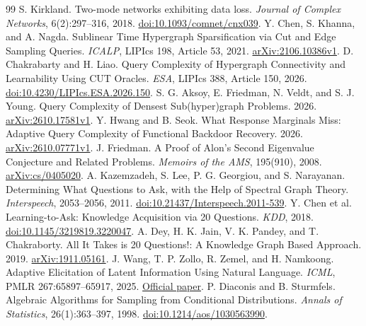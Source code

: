 \documentclass[11pt,a4paper]{article}
\theoremstyle{definition}
\theoremstyle{remark}\newtheorem{remark}[theorem]{주석}
\begin{document}
\begin{thebibliography}{99}
 S. Kirkland. Two-mode networks exhibiting data loss. \emph{Journal of Complex Networks}, 6(2):297--316, 2018. \href{https://doi.org/10.1093/comnet/cnx039}{doi:10.1093/comnet/cnx039}.
 Y. Chen, S. Khanna, and A. Nagda. Sublinear Time Hypergraph Sparsification via Cut and Edge Sampling Queries. \emph{ICALP}, LIPIcs 198, Article 53, 2021. \href{https://arxiv.org/abs/2106.10386v1}{arXiv:2106.10386v1}.
 D. Chakrabarty and H. Liao. Query Complexity of Hypergraph Connectivity and Learnability Using CUT Oracles. \emph{ESA}, LIPIcs 388, Article 150, 2026. \href{https://doi.org/10.4230/LIPIcs.ESA.2026.150}{doi:10.4230/LIPIcs.ESA.2026.150}.
 S. G. Aksoy, E. Friedman, N. Veldt, and S. J. Young. Query Complexity of Densest Sub(hyper)graph Problems. 2026. \href{https://arxiv.org/abs/2610.17581v1}{arXiv:2610.17581v1}.
 Y. Hwang and B. Seok. What Response Marginals Miss: Adaptive Query Complexity of Functional Backdoor Recovery. 2026. \href{https://arxiv.org/abs/2610.07771v1}{arXiv:2610.07771v1}.
 J. Friedman. A Proof of Alon's Second Eigenvalue Conjecture and Related Problems. \emph{Memoirs of the AMS}, 195(910), 2008. \href{https://arxiv.org/abs/cs/0405020}{arXiv:cs/0405020}.
 A. Kazemzadeh, S. Lee, P. G. Georgiou, and S. Narayanan. Determining What Questions to Ask, with the Help of Spectral Graph Theory. \emph{Interspeech}, 2053--2056, 2011. \href{https://doi.org/10.21437/Interspeech.2011-539}{doi:10.21437/Interspeech.2011-539}.
 Y. Chen et al. Learning-to-Ask: Knowledge Acquisition via 20 Questions. \emph{KDD}, 2018. \href{https://doi.org/10.1145/3219819.3220047}{doi:10.1145/3219819.3220047}.
 A. Dey, H. K. Jain, V. K. Pandey, and T. Chakraborty. All It Takes is 20 Questions!: A Knowledge Graph Based Approach. 2019. \href{https://arxiv.org/abs/1911.05161}{arXiv:1911.05161}.
 J. Wang, T. P. Zollo, R. Zemel, and H. Namkoong. Adaptive Elicitation of Latent Information Using Natural Language. \emph{ICML}, PMLR 267:65897--65917, 2025. \href{https://proceedings.mlr.press/v267/wang25ff.html}{Official paper}.
 P. Diaconis and B. Sturmfels. Algebraic Algorithms for Sampling from Conditional Distributions. \emph{Annals of Statistics}, 26(1):363--397, 1998. \href{https://doi.org/10.1214/aos/1030563990}{doi:10.1214/aos/1030563990}.
\end{thebibliography}
\end{document}
